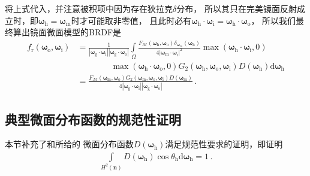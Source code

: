 将上式代入，并注意被积项中因为存在狄拉克$\delta$分布，
所以其只在完美镜面反射成立时，即${\bm\omega}_{\mathrm{h}}={\bm\omega}_{\mathrm{m}}$时才可能取非零值，
且此时必有${\bm\omega}_{\mathrm{h}}\cdot{\bm\omega}_{\mathrm{i}}={\bm\omega}_{\mathrm{h}}\cdot{\bm\omega}_{\mathrm{o}}$，
所以我们最终算出镜面微面模型的BRDF是
\begin{align}
    f_{\mathrm{r}}({\bm\omega}_{\mathrm{o}},{\bm\omega}_{\mathrm{i}})
     & =\frac{1}{|{\bm\omega}_{\mathrm{g}}\cdot{\bm\omega}_{\mathrm{i}}||{\bm\omega}_{\mathrm{g}}\cdot{\bm\omega}_{\mathrm{o}}|}
    \int\limits_{\varOmega}\frac{F_{\mathcal{M}}({\bm\omega}_{\mathrm{h}},{\bm\omega}_{\mathrm{o}})
    \delta_{{\bm\omega}_{\mathrm{m}}}({\bm\omega}_{\mathrm{h}})}
    {4|{\bm\omega}_{\mathrm{m}}\cdot{\bm\omega}_{\mathrm{i}}|^2}
    \max({\bm\omega}_{\mathrm{h}}\cdot{\bm\omega}_{\mathrm{i}},0)\nonumber                                                       \\
     & \qquad\qquad\max({\bm\omega}_{\mathrm{h}}\cdot{\bm\omega}_{\mathrm{o}},0)
    G_2({\bm\omega}_{\mathrm{h}},{\bm\omega}_{\mathrm{o}},{\bm\omega}_{\mathrm{i}})
    D({\bm\omega}_{\mathrm{h}})\mathrm{d}{\bm\omega}_{\mathrm{h}}\nonumber                                                       \\
     & =\frac{F_{\mathcal{M}}({\bm\omega}_{\mathrm{m}},{\bm\omega}_{\mathrm{o}})
    G_2({\bm\omega}_{\mathrm{m}},{\bm\omega}_{\mathrm{o}},{\bm\omega}_{\mathrm{i}})D({\bm\omega}_{\mathrm{m}})}
    {4|{\bm\omega}_{\mathrm{g}}\cdot{\bm\omega}_{\mathrm{i}}||{\bm\omega}_{\mathrm{g}}\cdot{\bm\omega}_{\mathrm{o}}|}\, .
\end{align}

\subsection{典型微面分布函数的规范性证明}\label{sub:典型微面分布函数的规范性证明}
本节补充了和所给的
微面分布函数$D({\bm\omega}_{\mathrm{h}})$满足规范性要求的证明，即证明
\begin{align}\label{eq:8.ex-01}
    \int\limits_{H^2({\bm n})}D({\bm\omega}_{\mathrm{h}})\cos\theta_{\mathrm{h}}\mathrm{d}{\bm\omega}_{\mathrm{h}}=1\, .
\end{align}

